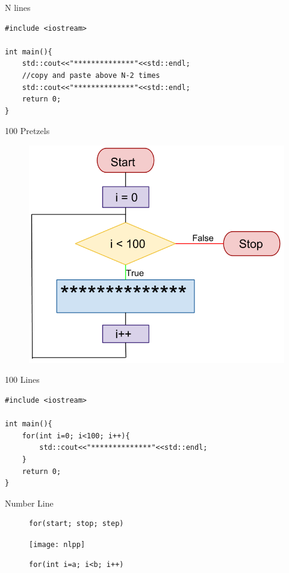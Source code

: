 \documentclass[xcolor={dvipsnames}]{beamer}
\begin{document}
\begin{frame}[fragile]{N lines}
\Large
\begin{verbatim}
#include <iostream>

int main(){
    std::cout<<"**************"<<std::endl;
    //copy and paste above N-2 times
    std::cout<<"**************"<<std::endl;
    return 0;
}
\end{verbatim}
\end{frame}

\begin{frame}{100 Pretzels}
\begin{figure}
		\includegraphics[width=.8\textwidth]{for_lines}
	\end{figure}
\end{frame}

\begin{frame}[fragile]{100 Lines}
\large
\begin{verbatim}
#include <iostream>

int main(){
    for(int i=0; i<100; i++){
        std::cout<<"**************"<<std::endl;
    }
    return 0;
}
\end{verbatim}
\end{frame}

\begin{frame}[fragile]{Number Line}
\Large
\begin{figure}
	\begin{verbatim}
for(start; stop; step)
	\end{verbatim}
	\pause
	\texttt{[image: nlpp]}
	\begin{verbatim}
for(int i=a; i<b; i++)
	\end{verbatim}
\end{figure}
\end{frame}
\end{document}
